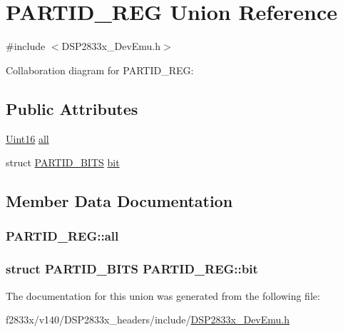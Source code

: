 \hypertarget{union_p_a_r_t_i_d___r_e_g}{}\section{P\+A\+R\+T\+I\+D\+\_\+\+R\+E\+G Union Reference}
\label{union_p_a_r_t_i_d___r_e_g}


{\ttfamily \#include $<$D\+S\+P2833x\+\_\+\+Dev\+Emu.\+h$>$}



Collaboration diagram for P\+A\+R\+T\+I\+D\+\_\+\+R\+E\+G\+:
\subsection*{Public Attributes}
\begin{DoxyCompactItemize}
\item 
\hyperlink{_d_s_p2833x___device_8h_a59a9f6be4562c327cbfb4f7e8e18f08b}{Uint16} \hyperlink{union_p_a_r_t_i_d___r_e_g_abb8db0d07a4e605bbf7371465b3d00a8}{all}
\item 
struct \hyperlink{struct_p_a_r_t_i_d___b_i_t_s}{P\+A\+R\+T\+I\+D\+\_\+\+B\+I\+T\+S} \hyperlink{union_p_a_r_t_i_d___r_e_g_ac0732748fb6314820c25e008cf228a31}{bit}
\end{DoxyCompactItemize}


\subsection{Member Data Documentation}
\hypertarget{union_p_a_r_t_i_d___r_e_g_abb8db0d07a4e605bbf7371465b3d00a8}{}
\subsubsection[{all}]{ P\+A\+R\+T\+I\+D\+\_\+\+R\+E\+G\+::all}\label{union_p_a_r_t_i_d___r_e_g_abb8db0d07a4e605bbf7371465b3d00a8}
\hypertarget{union_p_a_r_t_i_d___r_e_g_ac0732748fb6314820c25e008cf228a31}{}
\subsubsection[{bit}]{\setlength{\rightskip}{0pt plus 5cm}struct {\bf P\+A\+R\+T\+I\+D\+\_\+\+B\+I\+T\+S} P\+A\+R\+T\+I\+D\+\_\+\+R\+E\+G\+::bit}\label{union_p_a_r_t_i_d___r_e_g_ac0732748fb6314820c25e008cf228a31}


The documentation for this union was generated from the following file\+:\begin{DoxyCompactItemize}
\item 
f2833x/v140/\+D\+S\+P2833x\+\_\+headers/include/\hyperlink{_d_s_p2833x___dev_emu_8h}{D\+S\+P2833x\+\_\+\+Dev\+Emu.\+h}\end{DoxyCompactItemize}
